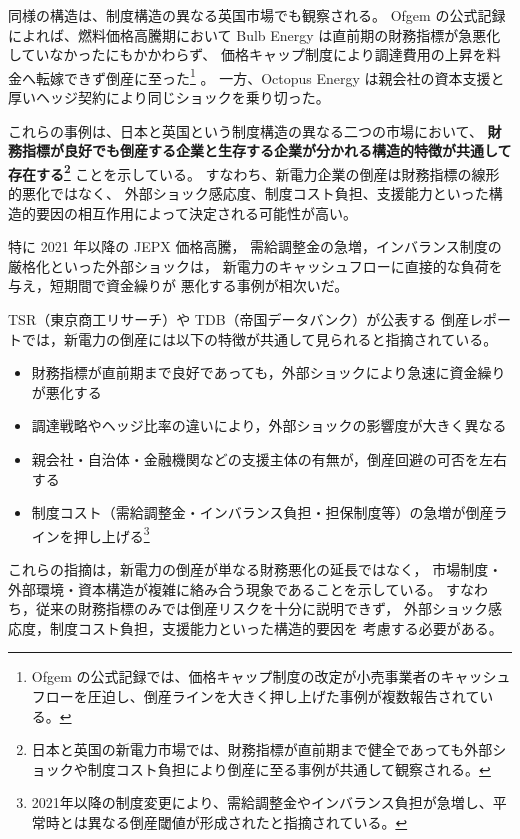 同様の構造は、制度構造の異なる英国市場でも観察される。
Ofgem の公式記録\parencite{Ofgem2021BulbSLR}によれば、燃料価格高騰期において
Bulb Energy は直前期の財務指標が急悪化していなかったにもかかわらず、
価格キャップ制度により調達費用の上昇を料金へ転嫁できず倒産に至った\footnote{Ofgem の公式記録では、価格キャップ制度の改定が小売事業者のキャッシュフローを圧迫し、倒産ラインを大きく押し上げた事例が複数報告されている。}
。
一方、Octopus Energy は親会社の資本支援と厚いヘッジ契約により同じショックを乗り切った\parencite{Ofgem2021OctopusTakeover,UKGov2021BulbSupport}。

これらの事例は、日本と英国という制度構造の異なる二つの市場において、
\textbf{財務指標が良好でも倒産する企業と生存する企業が分かれる構造的特徴が共通して存在する\footnote{日本と英国の新電力市場では、財務指標が直前期まで健全であっても外部ショックや制度コスト負担により倒産に至る事例が共通して観察される。}
}ことを示している。
すなわち、新電力企業の倒産は財務指標の線形的悪化ではなく、
外部ショック感応度、制度コスト負担、支援能力といった構造的要因の相互作用によって決定される可能性が高い。


特に 2021 年以降の JEPX 価格高騰，
需給調整金の急増，インバランス制度の厳格化といった外部ショックは，
新電力のキャッシュフローに直接的な負荷を与え，短期間で資金繰りが
悪化する事例が相次いだ。

TSR（東京商工リサーチ）や TDB（帝国データバンク）が公表する
倒産レポートでは，新電力の倒産には以下の特徴が共通して見られると指摘されている。

\begin{itemize}
    \item 財務指標が直前期まで良好であっても，外部ショックにより急速に資金繰りが悪化する
    \item 調達戦略やヘッジ比率の違いにより，外部ショックの影響度が大きく異なる
    \item 親会社・自治体・金融機関などの支援主体の有無が，倒産回避の可否を左右する
    \item 制度コスト（需給調整金・インバランス負担・担保制度等）の急増が倒産ラインを押し上げる\footnote{2021年以降の制度変更により、需給調整金やインバランス負担が急増し、平常時とは異なる倒産閾値が形成されたと指摘されている。}

\end{itemize}

これらの指摘は，新電力の倒産が単なる財務悪化の延長ではなく，
市場制度・外部環境・資本構造が複雑に絡み合う現象であることを示している。
すなわち，従来の財務指標のみでは倒産リスクを十分に説明できず，
外部ショック感応度，制度コスト負担，支援能力といった構造的要因を
考慮する必要がある。

